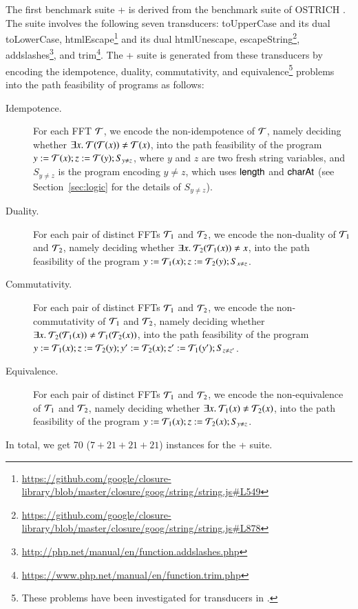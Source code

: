 The first benchmark suite {\transducerbench+} is derived from the {\transducerbench} benchmark suite of OSTRICH \cite{CHL+19}.  The {\transducerbench} suite involves the following seven transducers: toUpperCase and its dual toLowerCase, htmlEscape\footnote{\url{https://github.com/google/closure-library/blob/master/closure/goog/string/string.js#L549}} and its dual htmlUnescape, escapeString\footnote{\url{https://github.com/google/closure-library/blob/master/closure/goog/string/string.js#L878}}, addslashes\footnote{\url{http://php.net/manual/en/function.addslashes.php}}, and trim\footnote{\url{https://www.php.net/manual/en/function.trim.php}}. The {\transducerbench+} suite is generated from these transducers by encoding the idempotence, duality, commutativity, and equivalence\footnote{These problems have been investigated for transducers in \cite{BEK}.} problems into the path feasibility of {\slint} programs as follows:
\begin{description}
\item[Idempotence.] For each FFT $\mathcal{T}$,  we encode the non-idempotence of $\mathcal{T}$, namely deciding whether $\exists x.\ \mathcal{T}(\mathcal{T}(x)) \neq \mathcal{T}(x)$, into the path feasibility of the {\slint} program $y:=\mathcal{T}(x); z:=\mathcal{T}(y); S_{y \neq z}$, where $y$ and $z$ are two fresh string variables, and $S_{y \neq z}$ is the {\slint} program encoding $y \neq z$, which uses $\mathsf{length}$ and $\mathsf{charAt}$ (see Section~\ref{sec:logic} for the details of $S_{y \neq z}$).
%
\item[Duality.] For each pair of distinct FFTs $\mathcal{T}_1$ and $\mathcal{T}_2$, we encode the non-duality of $\mathcal{T}_1$ and $\mathcal{T}_2$, namely deciding whether $\exists x.\ \mathcal{T}_2(\mathcal{T}_1(x)) \neq x$, into the path feasibility of the {\slint} program $y:=\mathcal{T}_1(x); z: = \mathcal{T}_2(y); S_{x \neq z}$.
%
\item[Commutativity.] For each pair of distinct FFTs $\mathcal{T}_1$ and $\mathcal{T}_2$, we encode the non-commutativity of $\mathcal{T}_1$ and $\mathcal{T}_2$, namely deciding whether $\exists x.\ \mathcal{T}_2(\mathcal{T}_1(x)) \neq \mathcal{T}_1(\mathcal{T}_2(x))$, into the path feasibility of the {\slint} program $y:=\mathcal{T}_1(x); z: = \mathcal{T}_2(y); y':= \mathcal{T}_2(x); z': = \mathcal{T}_1(y'); S_{z \neq z'}$.
%
\item[Equivalence.] For each pair of distinct FFTs $\mathcal{T}_1$ and $\mathcal{T}_2$, we encode the non-equivalence of $\mathcal{T}_1$ and $\mathcal{T}_2$, namely deciding whether $\exists x.\ \mathcal{T}_1(x) \neq \mathcal{T}_2(x)$, into the path feasibility of the {\slint} program $y:=\mathcal{T}_1(x); z: = \mathcal{T}_2(x); S_{y \neq z}$.
%
\end{description}
In total, we get 70 ($7+21+21+21$)  instances for the {\transducerbench+} suite. 


